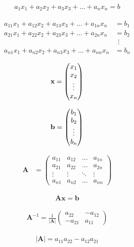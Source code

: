 \documentclass[fleqn,oneside]{article}
\begin{document}
\begin{align*}
	a_1x_1 + a_2x_2 + a_3x_3 +  \ldots + a_n x_n = b
\end{align*}


\begin{align*}
	a_{11}x_1 + a_{12}x_2 + a_{13}x_3 +  \ldots + a_{1n} x_n &= b_1 \\
	a_{21}x_1 + a_{22}x_2 + a_{23}x_3 +  \ldots + a_{2n} x_n &= b_2 \\
		& \ \ \vdots \\
	a_{n1}x_1 + a_{n2}x_2 + a_{n3}x_3 +  \ldots + a_{nn} x_n &= b_n
\end{align*}

\begin{align*}
\mathbf{x} = \left( \begin{matrix} x_1 \cr x_2 \cr \vdots \cr x_n\end{matrix} \right)
\end{align*}

\begin{align*}
	\mathbf{b} = \left( \begin{matrix} b_1 \cr b_2 \cr \vdots \cr b_n\end{matrix} \right)
\end{align*}


\begin{align*}
	\mathbf{A} &= \left(\begin{array}{cccc}
		a_{11}  &  a_{12} & \ldots  & a_{1n} \\
		a_{21} & a_{22}   & \ldots  & a_{2n} \\
		\vdots &  \vdots   & \ddots  & \vdots \\
		a_{n1}  & a_{n2} & \ldots  & a_{nn} 
	\end{array}\right)
\end{align*}

\begin{align*}
\mathbf{A}\mathbf{x}=\mathbf{b}
\end{align*}



\begin{align*}
\mathbf A^{-1} = \frac{1}{|\mathbf A|}
\left(\begin{array}{cc}
	a_{22}  & -a_{12} \\
	-a_{21}  & a_{11} 
\end{array}\right)
\end{align*}

\begin{align*}
	|\mathbf A| = 
a_{1 1}  a_{22} -a_{12}  a_{21}
\end{align*}
\end{document}
